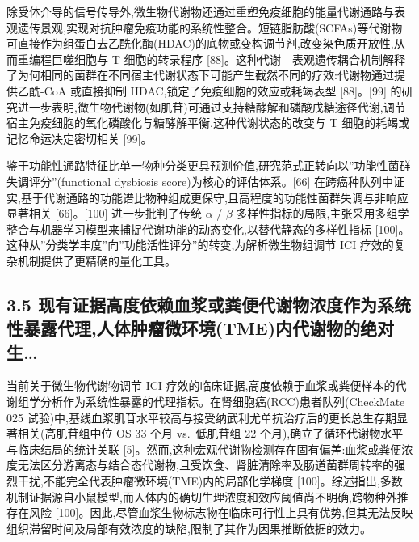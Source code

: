 \documentclass[11pt]{article}
\begin{document}
除受体介导的信号传导外,微生物代谢物还通过重塑免疫细胞的能量代谢通路与表观遗传景观,实现对抗肿瘤免疫功能的系统性整合。短链脂肪酸(SCFAs)等代谢物可直接作为组蛋白去乙酰化酶(HDAC)的底物或变构调节剂,改变染色质开放性,从而重编程巨噬细胞与 T 细胞的转录程序 {[}88{]}。这种代谢 - 表观遗传耦合机制解释了为何相同的菌群在不同宿主代谢状态下可能产生截然不同的疗效:代谢物通过提供乙酰-CoA 或直接抑制 HDAC,锁定了免疫细胞的效应或耗竭表型 {[}88{]}。{[}99{]} 的研究进一步表明,微生物代谢物(如肌苷)可通过支持糖酵解和磷酸戊糖途径代谢,调节宿主免疫细胞的氧化磷酸化与糖酵解平衡,这种代谢状态的改变与 T 细胞的耗竭或记忆命运决定密切相关 {[}99{]}。

鉴于功能性通路特征比单一物种分类更具预测价值,研究范式正转向以''功能性菌群失调评分''(functional dysbiosis score)为核心的评估体系。{[}66{]} 在跨癌种队列中证实,基于代谢通路的功能谱比物种组成更保守,且高程度的功能性菌群失调与非响应显著相关 {[}66{]}。{[}100{]} 进一步批判了传统 \(\alpha\) / \(\beta\) 多样性指标的局限,主张采用多组学整合与机器学习模型来捕捉代谢功能的动态变化,以替代静态的多样性指标 {[}100{]}。这种从''分类学丰度''向''功能活性评分''的转变,为解析微生物组调节 ICI 疗效的复杂机制提供了更精确的量化工具。

\subsection{3.5 现有证据高度依赖血浆或粪便代谢物浓度作为系统性暴露代理,人体肿瘤微环境(TME)内代谢物的绝对生\ldots{}}\label{ux73b0ux6709ux8bc1ux636eux9ad8ux5ea6ux4f9dux8d56ux8840ux6d46ux6216ux7caaux4fbfux4ee3ux8c22ux7269ux6d53ux5ea6ux4f5cux4e3aux7cfbux7edfux6027ux66b4ux9732ux4ee3ux7406ux4ebaux4f53ux80bfux7624ux5faeux73afux5883tmeux5185ux4ee3ux8c22ux7269ux7684ux7eddux5bf9ux751f}

当前关于微生物代谢物调节 ICI 疗效的临床证据,高度依赖于血浆或粪便样本的代谢组学分析作为系统性暴露的代理指标。在肾细胞癌(RCC)患者队列(CheckMate 025 试验)中,基线血浆肌苷水平较高与接受纳武利尤单抗治疗后的更长总生存期显著相关(高肌苷组中位 OS 33 个月 vs.~低肌苷组 22 个月),确立了循环代谢物水平与临床结局的统计关联 {[}5{]}。然而,这种宏观代谢物检测存在固有偏差:血浆或粪便浓度无法区分游离态与结合态代谢物,且受饮食、肾脏清除率及肠道菌群周转率的强烈干扰,不能完全代表肿瘤微环境(TME)内的局部化学梯度 {[}100{]}。综述指出,多数机制证据源自小鼠模型,而人体内的确切生理浓度和效应阈值尚不明确,跨物种外推存在风险 {[}100{]}。因此,尽管血浆生物标志物在临床可行性上具有优势,但其无法反映组织滞留时间及局部有效浓度的缺陷,限制了其作为因果推断依据的效力。
\end{document}
